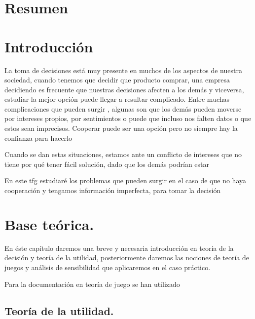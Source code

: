 \documentclass[a4paper]{report} %
\begin{document}
\tableofcontents

\listoffigures
\listoftables

\newpage

\chapter{Resumen}


\chapter{Introducción}

La toma de decisiones está muy presente en muchos de los aspectos de nuestra sociedad, cuando tenemos que decidir que producto comprar, una empresa decidiendo 
es frecuente que  nuestras decisiones afecten a los demás y viceversa, estudiar la mejor opción puede llegar a resultar complicado. Entre muchas complicaciones que pueden surgir , algunas son que los demás pueden moverse por intereses propios, por sentimientos o puede que incluso nos falten datos o que estos sean imprecisos. Cooperar puede ser una opción pero no siempre hay la confianza para hacerlo





Cuando se dan estas situaciones, estamos ante un conflicto de intereses que no tiene por qué tener fácil solución, dado que los demás podrían estar 








En este tfg estudiaré los problemas que pueden surgir en el caso de que no haya cooperación y tengamos información imperfecta, para tomar la decisión 

\chapter{Base teórica.}


En éste capítulo daremos una breve y necesaria introducción en teoría de la decisión y teoría de la utilidad, posteriormente daremos las nociones de teoría de juegos y análisis de sensibilidad que aplicaremos en el caso práctico.

Para la documentación en teoría de juego se han utilizado




\section{Teoría de la utilidad.}
\end{document}
